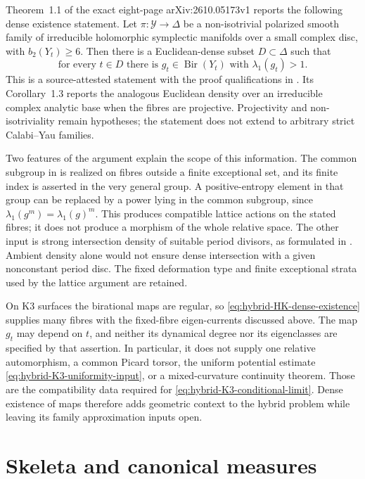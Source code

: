 Theorem~1.1 of the exact eight-page arXiv:2610.05173v1 reports
the following dense existence statement. Let
$\pi:\mathcal Y\to\Delta$ be a non-isotrivial polarized smooth
family of irreducible holomorphic symplectic manifolds over a small
complex disc, with $b_2(Y_t)\geq6$. Then there is a Euclidean-dense
subset $D\subset\Delta$ such that
\[
 \text{for every }t\in D\text{ there is }
 g_t\in\operatorname{Bir}(Y_t)
 \text{ with }\lambda_1(g_t)>1.
\tag{66.29ac}\label{eq:hybrid-HK-dense-existence}
\]
This is a source-attested statement with the proof qualifications
in . Its Corollary~1.3
reports the analogous Euclidean density over an irreducible complex
analytic base when the fibres are projective. Projectivity and
non-isotriviality remain hypotheses; the statement does not extend
to arbitrary strict Calabi--Yau families.

Two features of the argument explain the scope of this information.
The common subgroup in
\cite[Theorem~1.1]{DenisiEtAl26GroupsV1} is realized on fibres
outside a finite exceptional set, and its finite index is asserted
in the very general group. A positive-entropy element in that group
can be replaced by a power lying in the common subgroup, since
$\lambda_1(g^m)=\lambda_1(g)^m$. This produces compatible lattice
actions on the stated fibres; it does not produce a morphism of
the whole relative space. The other input is strong intersection
density of suitable period divisors, as formulated in
\cite[Definition~2.8 and Theorem~2.10]{AmerikSoldatenkovVerbitsky26V1}.
Ambient density alone would not ensure dense intersection with a
given nonconstant period disc. The fixed deformation type and
finite exceptional strata used by the lattice argument are retained.

On K3 surfaces the birational maps are regular, so
\eqref{eq:hybrid-HK-dense-existence} supplies many fibres with
the fixed-fibre eigen-currents discussed above. The map $g_t$ may
depend on $t$, and neither its dynamical degree nor its eigenclasses
are specified by that assertion. In particular, it does not supply
one relative automorphism, a common Picard torsor, the uniform
potential estimate \eqref{eq:hybrid-K3-uniformity-input}, or a
mixed-curvature continuity theorem. Those are the compatibility
data required for \eqref{eq:hybrid-K3-conditional-limit}.
Dense existence of maps therefore adds geometric context to the
hybrid problem while leaving its family approximation inputs open.


\section{Skeleta and canonical measures}
\label{sec:hybrid-skeleta}

